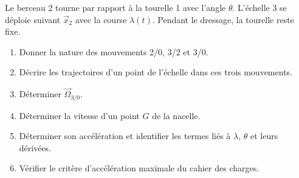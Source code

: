 Le berceau 2 tourne par rapport à la tourelle 1 avec l'angle $\theta$.
L'échelle 3 se déploie suivant $\vec x_2$ avec la course $\lambda(t)$.
Pendant le dressage, la tourelle reste fixe.


\begin{enumerate}
  \item Donner la nature des mouvements 2/0, 3/2 et 3/0.
  \item Décrire les trajectoires d'un point de l'échelle dans ces trois mouvements.
  \item Déterminer $\vec\Omega_{3/0}$.
  \item Déterminer la vitesse d'un point $G$ de la nacelle.
  \item Déterminer son accélération et identifier les termes liés à $\lambda$, $\theta$ et leurs dérivées.
  \item Vérifier le critère d'accélération maximale du cahier des charges.
\end{enumerate}
